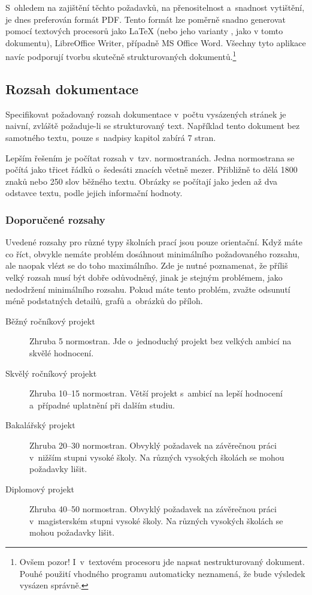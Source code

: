 S~ohledem na zajištění těchto požadavků, na přenositelnost a~snadnost vytištění, je dnes preferován formát PDF. Tento formát lze poměrně snadno generovat pomocí textových procesorů jako {\LaTeX} (nebo jeho varianty \XeLaTeX{}, jako v tomto dokumentu), LibreOffice Writer, případně MS Office Word. Všechny tyto aplikace navíc podporují tvorbu skutečně strukturovaných dokumentů.\footnote{Ovšem pozor! I~v~textovém procesoru jde napsat nestrukturovaný dokument. Pouhé použití vhodného programu automaticky neznamená, že bude výsledek vysázen správně.}

\subsection{Rozsah dokumentace}
Specifikovat požadovaný rozsah dokumentace v~počtu vysázených stránek je naivní, zvláště po\-ža\-du\-je-li se strukturovaný text. Například tento dokument bez samotného textu, pouze s~nadpisy kapitol zabírá 7 stran.

Lepším řešením je počítat rozsah v~tzv. normostranách. Jedna normostrana se počítá jako třicet řádků o~šedesáti znacích včetně mezer. Přibližně to dělá 1800 znaků nebo 250 slov běžného textu. Obrázky se počítají jako jeden až dva odstavce textu, podle jejich informační hodnoty.

\subsubsection*{Doporučené rozsahy}
Uvedené rozsahy pro různé typy školních prací jsou pouze orientační. Když máte co říct, obvykle nemáte problém dosáhnout minimálního požadovaného rozsahu, ale naopak vlézt se do toho maximálního. Zde je nutné poznamenat, že příliš velký rozsah musí být dobře odůvodněný, jinak je stejným problémem, jako nedodržení minimálního rozsahu. Pokud máte tento problém, zvažte odsunutí méně podstatných detailů, grafů a~obrázků do příloh.

\begin{description}
  \item[Běžný ročníkový projekt] Zhruba 5 normostran. Jde o~jednoduchý projekt bez velkých ambicí na skvělé hodnocení.
  \item[Skvělý ročníkový projekt] Zhruba 10--15 normostran. Větší projekt s~ambicí na lepší hodnocení a~případné uplatnění při dalším studiu.
  \item[Bakalářský projekt] Zhruba 20--30 normostran. Obvyklý požadavek na závěrečnou práci v~nižším stupni vysoké školy. Na různých vysokých školách se mohou požadavky lišit.
  \item[Diplomový projekt] Zhruba 40--50 normostran. Obvyklý požadavek na závěrečnou práci v~ma\-gisterském stupni vysoké školy. Na různých vysokých školách se mohou požadavky lišit.
\end{description}

